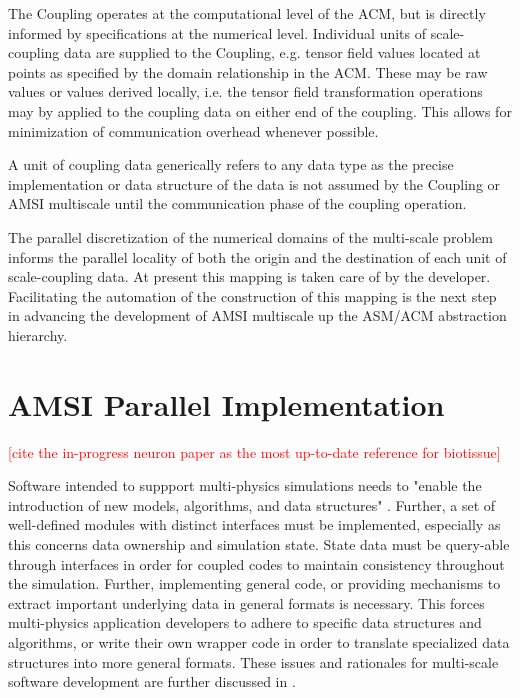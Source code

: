 \documentclass[review]{siamart1116}
\newcommand{\red}[1]{\textcolor{red}{[#1]}}
\begin{document}
The Coupling operates at the computational level of the ACM, but is directly informed by specifications at the numerical level. Individual units of scale-coupling data are supplied to the Coupling, e.g. tensor field values located at points as specified by the domain relationship in the ACM. These may be raw values or values derived locally, i.e. the tensor field transformation operations may by applied to the coupling data on either end of the coupling. This allows for minimization of communication overhead whenever possible.

A unit of coupling data generically refers to any data type as the precise implementation or data structure of the data is not assumed by the Coupling or AMSI multiscale until the communication phase of the coupling operation.

The parallel discretization of the numerical domains of the multi-scale problem informs the parallel locality of both the origin and the destination of each unit of scale-coupling data. At present this mapping is taken care of by the developer. Facilitating the automation of the construction of this mapping is the next step in advancing the development of AMSI multiscale up the ASM/ACM abstraction hierarchy.

\section{AMSI Parallel Implementation}\label{sec:amsi-par-impl}

\red{cite the in-progress neuron paper as the most up-to-date reference for biotissue}

Software intended to suppport multi-physics simulations needs to "enable the introduction of new models, algorithms, and data structures" \cite{keyes2013multiphysics}. Further, a set of well-defined modules with distinct interfaces must be implemented, especially as this concerns data ownership and simulation state. State data must be query-able through interfaces in order for coupled codes to maintain consistency throughout the simulation. Further, implementing general code, or providing mechanisms to extract important underlying data in general formats is necessary. This forces multi-physics application developers to adhere to specific data structures and algorithms, or write their own wrapper code in order to translate specialized data structures into more general formats. These issues and rationales for multi-scale software development are further discussed in \cite{keyes2013multiphysics}.
\end{document}
